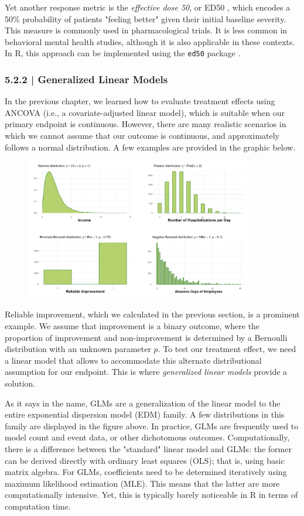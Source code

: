 Yet another response metric is the \emph{effective dose 50}, or ED50 \citep{bauer2021effective}, which encodes a 50\% probability of patients "feeling better" given their initial baseline severity. This measure is commonly used in pharmacological trials. It is less common in behavioral mental health studies, although it is also applicable in these contexts. In \textsf{R}, this approach can be implemented using the \texttt{ed50} package \citep{ed50}.


\subsubsection{{\normalfont\textsf{\textcolor{sBlue}{\small 5.2.2 |}}} Generalized Linear Models}

In the previous chapter, we learned how to evaluate treatment effects using ANCOVA (i.e., a covariate-adjusted linear model), which is suitable when our primary endpoint is continuous. However, there are many realistic scenarios in which we cannot assume that our outcome is continuous, and approximately follows a normal distribution. A few examples are provided in the graphic below.

\begin{figure}[H]
\includegraphics[width=10cm]{images/glm.png}
\centering
\end{figure}

Reliable improvement, which we calculated in the previous section, is a prominent example. We assume that improvement is a binary outcome, where the proportion of improvement and non-improvement is determined by a Bernoulli distribution with an unknown parameter $p$. To test our treatment effect, we need a linear model that allows to accommodate this alternate distributional assumption for our endpoint. This is where \emph{generalized linear models} \citep[GLMs;][chap. 5]{dunn2018generalized} provide a solution.

As it says in the name, GLMs are a generalization of the linear model to the entire exponential dispersion model (EDM) family. A few distributions in this family are displayed in the figure above. In practice, GLMs are frequently used to model count and event data, or other dichotomous outcomes. Computationally, there is a difference between the "standard" linear model and GLMs: the former can be derived directly with ordinary least squares (OLS); that is, using basic matrix algebra. For GLMs, coefficients need to be determined iteratively using maximum likelihood estimation (MLE). This means that the latter are more computationally intensive. Yet, this is typically barely noticeable in \textsf{R} in terms of computation time.

